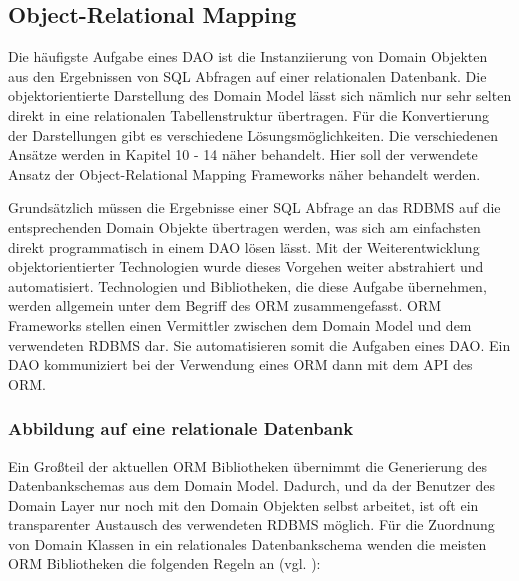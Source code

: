 \subsection{Object-Relational Mapping}\label{subsec:orm}
Die häufigste Aufgabe eines \ac{DAO} ist die Instanziierung von Domain Objekten
aus den Ergebnissen von \ac{SQL} Abfragen auf einer relationalen Datenbank. Die
objektorientierte Darstellung des Domain Model lässt sich nämlich nur sehr selten
direkt in eine relationalen Tabellenstruktur übertragen. Für die Konvertierung
der Darstellungen gibt es verschiedene Lösungsmöglichkeiten. Die verschiedenen
Ansätze werden in \cite{fowler:2002} Kapitel 10 - 14 näher behandelt. Hier soll
der verwendete Ansatz der Object-Relational Mapping Frameworks näher behandelt
werden.

Grundsätzlich müssen die Ergebnisse einer \ac{SQL} Abfrage an das \ac{RDBMS} auf
die entsprechenden Domain Objekte übertragen werden, was sich am einfachsten
direkt programmatisch in einem \ac{DAO} lösen lässt. Mit der Weiterentwicklung
objektorientierter Technologien wurde dieses Vorgehen weiter abstrahiert und
automatisiert. Technologien und Bibliotheken, die diese Aufgabe übernehmen,
werden allgemein unter dem Begriff des \ac{ORM} zusammengefasst. \ac{ORM} Frameworks
stellen einen Vermittler zwischen dem Domain Model und dem verwendeten \ac{RDBMS}
dar. Sie automatisieren somit die Aufgaben eines \ac{DAO}. Ein \ac{DAO}
kommuniziert bei der Verwendung eines \ac{ORM} dann mit dem \ac{API} des
\ac{ORM}.

\subsubsection{Abbildung auf eine relationale Datenbank}  
Ein Großteil der aktuellen \ac{ORM} Bibliotheken übernimmt die Generierung des
Datenbankschemas aus dem Domain Model. Dadurch, und da der Benutzer des Domain
Layer nur noch mit den Domain Objekten selbst arbeitet, ist oft ein transparenter
Austausch des verwendeten \ac{RDBMS} möglich. Für die Zuordnung von Domain
Klassen in ein relationales Datenbankschema wenden die meisten \ac{ORM}
Bibliotheken die folgenden Regeln an (vgl. \cite{wiki:orm}):

